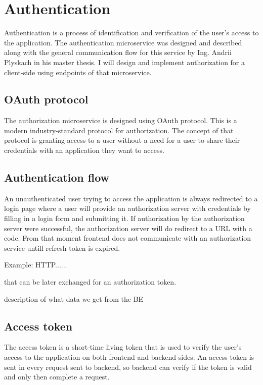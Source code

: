 \section{Authentication} Authentication is a process of identification and verification of the user's access to the application. The authentication microservice was designed and described along with the general communication flow for this service by Ing. Andrii Plyskach in his master thesis\cite{mt-plyskach}. I will design and implement authorization for a client-side using endpoints of that microservice. 


\subsection{OAuth protocol}
The authorization microservice is designed using OAuth protocol. This is a modern industry-standard protocol for authorization. The concept of that protocol is granting access to a user without a need for a user to share their credentials with an application they want to access.

 
 \subsection{Authentication flow}
 An unauthenticated user trying to access the application is always redirected to a login page where a user will provide an authorization server with credentials by filling in a login form and submitting it. If authorization by the authorization server were successful, the authorization server will do redirect to a URL with a code. From that moment frontend does not communicate with an authorization service untill refresh token is expired.



Example: HTTP......

that can be later exchanged for an authorization token. 





description of what data we get from the BE

\subsection{Access token}
The access token is a short-time living token that is used to verify the user's access to the application on both frontend and backend sides. An access token is sent in every request sent to backend, so backend can verify if the token is valid and only then complete a request.

